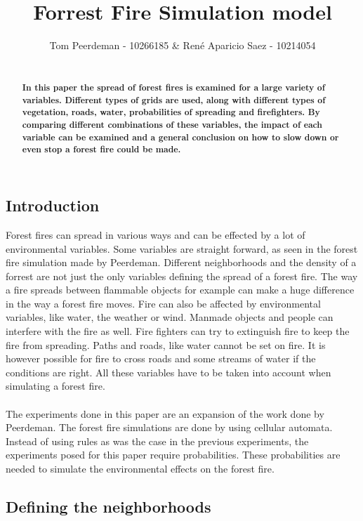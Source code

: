 \documentclass{article}
\title{Forrest Fire Simulation model}
\author{Tom Peerdeman - 10266185 \& Ren\'e Aparicio Saez - 10214054}
\begin{document}
\maketitle

\begin{abstract}
\textbf{\\In this paper the spread of forest fires is examined for a large variety of variables. Different types of grids are used, along with different types of vegetation, roads, water, probabilities of spreading and firefighters. By comparing different combinations of these variables, the impact of each variable can be examined and a general conclusion on how to slow down or even stop a forest fire could be made.}
\end{abstract}

\begin{multicols}{2}

\subsection*{Introduction}
Forest fires can spread in various ways and can be effected by a lot of environmental variables. Some variables are straight forward, as seen in the forest fire simulation made by Peerdeman\cite{oldcode}. Different neighborhoods and the density of a forrest are not just the only variables defining the spread of a forest fire. The way a fire spreads between flammable objects for example can make a huge difference in the way a forest fire moves. Fire can also be affected by environmental variables, like water, the weather or wind. Manmade objects and people can interfere with the fire as well. Fire fighters can try to extinguish fire to keep the fire from spreading. Paths and roads, like water cannot be set on fire. It is however possible for fire to cross roads and some streams of water if the conditions are right. All these variables have to be taken into account when simulating a forest fire.\\\\
The experiments done in this paper are an expansion of the work done by Peerdeman\cite{oldcode}. The forest fire simulations are done by using cellular automata. Instead of using rules as was the case in the previous experiments, the experiments posed for this paper require probabilities. These probabilities are needed to simulate the environmental effects on the forest fire. 

\subsection*{Defining the neighborhoods}

\end{multicols}
\end{document}
